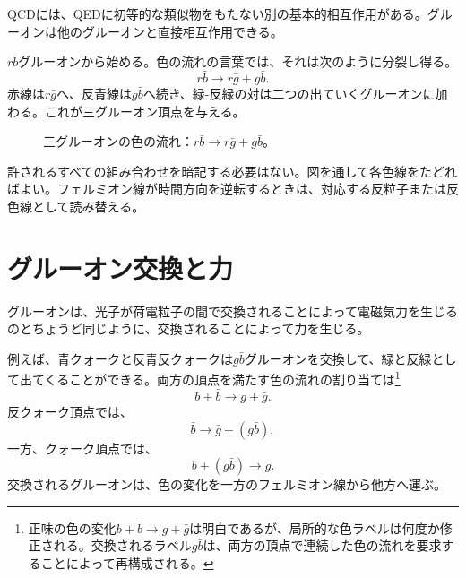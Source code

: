 QCDには、QEDに初等的な類似物をもたない別の基本的相互作用がある。グルーオンは他のグルーオンと直接相互作用できる。

\(r\bar b\)グルーオンから始める。色の流れの言葉では、それは次のように分裂し得る。
\begin{equation}
r\bar b
\longrightarrow
r\bar g+g\bar b.
\end{equation}
赤線は\(r\bar g\)へ、反青線は\(g\bar b\)へ続き、緑-反緑の対は二つの出ていくグルーオンに加わる。これが三グルーオン頂点を与える。

\begin{figure}[h]
\centering
{}
\caption{三グルーオンの色の流れ：\(r\bar b\rightarrow r\bar g+g\bar b\)。}
\end{figure}

許されるすべての組み合わせを暗記する必要はない。図を通して各色線をたどればよい。フェルミオン線が時間方向を逆転するときは、対応する反粒子または反色線として読み替える。

\section{グルーオン交換と力}

グルーオンは、光子が荷電粒子の間で交換されることによって電磁気力を生じるのとちょうど同じように、交換されることによって力を生じる。

例えば、青クォークと反青反クォークは\(g\bar b\)グルーオンを交換して、緑と反緑として出てくることができる。両方の頂点を満たす色の流れの割り当ては\footnote{正味の色の変化\(b+\bar b\longrightarrow g+\bar g\)は明白であるが、局所的な色ラベルは何度か修正される。交換されるラベル\(g\bar b\)は、両方の頂点で連続した色の流れを要求することによって再構成される。}
\begin{equation}
b+\bar b
\longrightarrow
g+\bar g.
\end{equation}
反クォーク頂点では、
\begin{equation}
\bar b\longrightarrow\bar g+(g\bar b),
\end{equation}
一方、クォーク頂点では、
\begin{equation}
b+(g\bar b)\longrightarrow g.
\end{equation}
交換されるグルーオンは、色の変化を一方のフェルミオン線から他方へ運ぶ。

